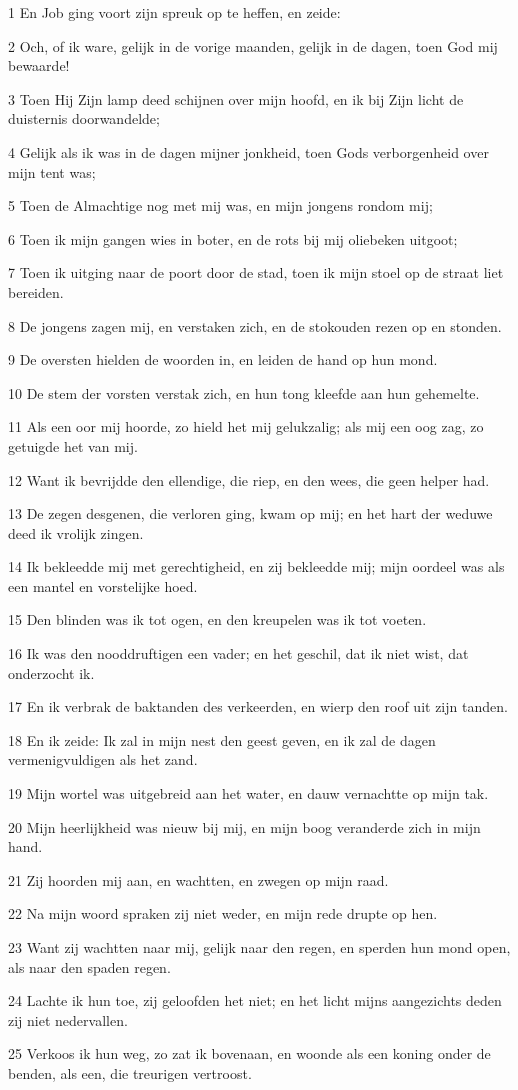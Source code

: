 \par 1 En Job ging voort zijn spreuk op te heffen, en zeide:
\par 2 Och, of ik ware, gelijk in de vorige maanden, gelijk in de dagen, toen God mij bewaarde!
\par 3 Toen Hij Zijn lamp deed schijnen over mijn hoofd, en ik bij Zijn licht de duisternis doorwandelde;
\par 4 Gelijk als ik was in de dagen mijner jonkheid, toen Gods verborgenheid over mijn tent was;
\par 5 Toen de Almachtige nog met mij was, en mijn jongens rondom mij;
\par 6 Toen ik mijn gangen wies in boter, en de rots bij mij oliebeken uitgoot;
\par 7 Toen ik uitging naar de poort door de stad, toen ik mijn stoel op de straat liet bereiden.
\par 8 De jongens zagen mij, en verstaken zich, en de stokouden rezen op en stonden.
\par 9 De oversten hielden de woorden in, en leiden de hand op hun mond.
\par 10 De stem der vorsten verstak zich, en hun tong kleefde aan hun gehemelte.
\par 11 Als een oor mij hoorde, zo hield het mij gelukzalig; als mij een oog zag, zo getuigde het van mij.
\par 12 Want ik bevrijdde den ellendige, die riep, en den wees, die geen helper had.
\par 13 De zegen desgenen, die verloren ging, kwam op mij; en het hart der weduwe deed ik vrolijk zingen.
\par 14 Ik bekleedde mij met gerechtigheid, en zij bekleedde mij; mijn oordeel was als een mantel en vorstelijke hoed.
\par 15 Den blinden was ik tot ogen, en den kreupelen was ik tot voeten.
\par 16 Ik was den nooddruftigen een vader; en het geschil, dat ik niet wist, dat onderzocht ik.
\par 17 En ik verbrak de baktanden des verkeerden, en wierp den roof uit zijn tanden.
\par 18 En ik zeide: Ik zal in mijn nest den geest geven, en ik zal de dagen vermenigvuldigen als het zand.
\par 19 Mijn wortel was uitgebreid aan het water, en dauw vernachtte op mijn tak.
\par 20 Mijn heerlijkheid was nieuw bij mij, en mijn boog veranderde zich in mijn hand.
\par 21 Zij hoorden mij aan, en wachtten, en zwegen op mijn raad.
\par 22 Na mijn woord spraken zij niet weder, en mijn rede drupte op hen.
\par 23 Want zij wachtten naar mij, gelijk naar den regen, en sperden hun mond open, als naar den spaden regen.
\par 24 Lachte ik hun toe, zij geloofden het niet; en het licht mijns aangezichts deden zij niet nedervallen.
\par 25 Verkoos ik hun weg, zo zat ik bovenaan, en woonde als een koning onder de benden, als een, die treurigen vertroost.

